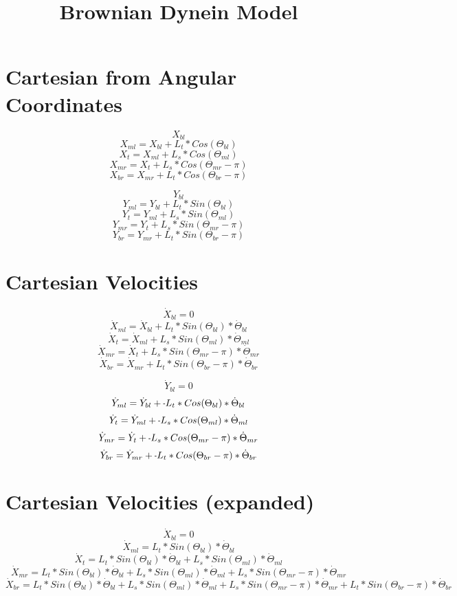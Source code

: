 \documentclass[11pt, landscape]{article}
\title{Brownian Dynein Model}
\newcommand{\mn}{\scalebox{0.7}[1.0]{-}}
\begin{document}
\maketitle

\section{Cartesian from Angular Coordinates}
$$X_{bl}$$
$$X_{ml} = X_{bl}+L_{t}*Cos(\Theta_{bl})$$
$$X_{t}  = X_{ml}+L_{s}*Cos(\Theta_{ml})$$
$$X_{mr} = X_{t} +L_{s}*Cos(\Theta_{mr}-\pi)$$
$$X_{br} = X_{mr}+L_{t}*Cos(\Theta_{br}-\pi)$$

$$Y_{bl}$$
$$Y_{ml} = Y_{bl}+L_{t}*Sin(\Theta_{bl})$$
$$Y_{t}  = Y_{ml}+L_{s}*Sin(\Theta_{ml})$$
$$Y_{mr} = Y_{t} +L_{s}*Sin(\Theta_{mr}-\pi)$$
$$Y_{br} = Y_{mr}+L_{t}*Sin(\Theta_{br}-\pi)$$

\section{Cartesian Velocities}
$$\dot{X}_{bl} = 0$$
$$\dot{X}_{ml} = \dot{X}_{bl} + L_{t}*Sin(\Theta_{bl})     * \dot{\Theta}_{bl}$$
$$\dot{X}_{t } = \dot{X}_{ml} + L_{s}*Sin(\Theta_{ml})     * \dot{\Theta}_{ml}$$
$$\dot{X}_{mr} = \dot{X}_{t } + L_{s}*Sin(\Theta_{mr}-\pi) * \dot{\Theta}_{mr}$$
$$\dot{X}_{br} = \dot{X}_{mr} + L_{t}*Sin(\Theta_{br}-\pi) * \dot{\Theta}_{br}$$
                                                                               
$$\dot{Y}_{bl} = 0$$                                                               
$$\dot{Y}_{ml} = \dot{Y}_{bl} + \mn L_{t}*Cos(\Theta_{bl})     * \dot{\Theta}_{bl}$$
$$\dot{Y}_{t}  = \dot{Y}_{ml} + \mn L_{s}*Cos(\Theta_{ml})     * \dot{\Theta}_{ml}$$
$$\dot{Y}_{mr} = \dot{Y}_{t } + \mn L_{s}*Cos(\Theta_{mr}-\pi) * \dot{\Theta}_{mr}$$
$$\dot{Y}_{br} = \dot{Y}_{mr} + \mn L_{t}*Cos(\Theta_{br}-\pi) * \dot{\Theta}_{br}$$

\section{Cartesian Velocities (expanded)}
$$\dot{X}_{bl} = 0$$
$$\dot{X}_{ml} = L_{t}*Sin(\Theta_{bl}) * \dot{\Theta}_{bl}$$
$$\dot{X}_{t } = L_{t}*Sin(\Theta_{bl}) * \dot{\Theta}_{bl} + L_{s}*Sin(\Theta_{ml})     * \dot{\Theta}_{ml}$$
$$\dot{X}_{mr} = L_{t}*Sin(\Theta_{bl}) * \dot{\Theta}_{bl} + L_{s}*Sin(\Theta_{ml})     * \dot{\Theta}_{ml} + L_{s}*Sin(\Theta_{mr}-\pi) * \dot{\Theta}_{mr}$$
$$\dot{X}_{br} = L_{t}*Sin(\Theta_{bl}) * \dot{\Theta}_{bl} + L_{s}*Sin(\Theta_{ml})     * \dot{\Theta}_{ml} + L_{s}*Sin(\Theta_{mr}-\pi) * \dot{\Theta}_{mr} + L_{t}*Sin(\Theta_{br}-\pi) * \dot{\Theta}_{br}$$
                                                                               
\end{document}
